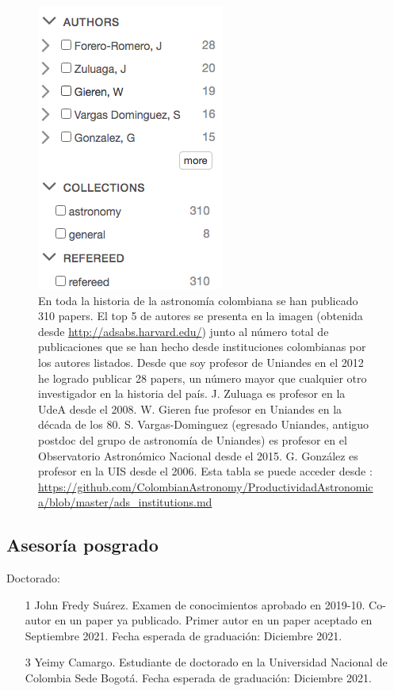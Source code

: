 \documentclass{article}
\begin{document}
\begin{figure}[!h]
\begin{center}
\includegraphics[scale=0.55]{colombia_ADS.png}
\caption{En toda la historia de la astronom\'ia colombiana se han publicado 310 papers. El top 5 de autores se presenta en la imagen (obtenida desde \url{http://adsabs.harvard.edu/}) junto al n\'umero total de publicaciones que se han hecho desde instituciones colombianas por los autores listados.
Desde que soy profesor de Uniandes en el 2012 he logrado publicar 28 papers, un n\'umero mayor que cualquier otro investigador en la historia del pa\'is. J. Zuluaga es profesor en la UdeA desde el 2008. W. Gieren fue profesor en Uniandes en la d\'ecada de los 80. S. Vargas-Dominguez (egresado Uniandes, antiguo postdoc del grupo de astronom\'ia de Uniandes) es profesor en el Observatorio Astron\'omico Nacional desde el 2015. G. Gonz\'alez es profesor en la UIS desde el 2006.
Esta tabla se puede acceder desde : 
\url{https://github.com/ColombianAstronomy/ProductividadAstronomica/blob/master/ads_institutions.md}
\label{table:astro}}
\end{center}
\end{figure}

\newpage

\subsection{Asesor\'ia posgrado}

Doctorado:
\begin{itemize}

\item [1] John Fredy Su\'arez. Examen de conocimientos aprobado en 2019-10. Co-autor en un paper ya publicado. Primer autor en un paper aceptado en Septiembre 2021. Fecha esperada de graduaci\'on: Diciembre 2021.
\item [3] Yeimy Camargo. Estudiante de doctorado en la Universidad Nacional de Colombia
  Sede Bogot\'a. Fecha esperada de graduaci\'on: Diciembre 2021.
\end{itemize}
\end{document}
